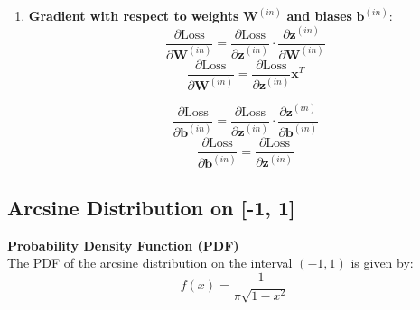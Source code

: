 \begin{enumerate}[label=\textbf{\roman*.}]
  \item \textbf{Gradient with respect to weights} $\mathbf{W}^{(in)}$ \textbf{and biases} $\mathbf{b}^{(in)}$:
       \[
  \frac{\partial \text{Loss}}{\partial \mathbf{W}^{(in)}} = \frac{\partial \text{Loss}}{\partial \mathbf{z}^{(in)}} \cdot \frac{\partial \mathbf{z}^{(in)}}{\partial \mathbf{W}^{(in)}}
  \]
  \begin{equation}
  \frac{\partial \text{Loss}}{\partial \mathbf{W}^{(in)}} = \frac{\partial \text{Loss}}{\partial \mathbf{z}^{(in)}} \mathbf{x}^T
  \end{equation}

         \[
  \frac{\partial \text{Loss}}{\partial \mathbf{b}^{(in)}} = \frac{\partial \text{Loss}}{\partial \mathbf{z}^{(in)}} \cdot \frac{\partial \mathbf{z}^{(in)}}{\partial \mathbf{b}^{(in)}}
  \]
  \begin{equation}
  \frac{\partial \text{Loss}}{\partial \mathbf{b}^{(in)}} = \frac{\partial \text{Loss}}{\partial \mathbf{z}^{(in)}}
  \end{equation}
\end{enumerate}

\pagebreak


\setcounter{subsection}{2}
\subsection{Arcsine Distribution on [-1, 1]}
\label{app:arcsine-distribution}

\textbf{Probability Density Function (PDF)}\\
The PDF of the arcsine distribution on the interval \((-1, 1)\) is given by:
\begin{equation}
    f(x) = \frac{1}{\pi \sqrt{1-x^2}}
\end{equation}

